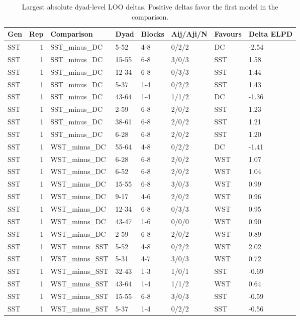 \begin{table}[!h]
\centering
\caption{Largest absolute dyad-level LOO deltas. Positive deltas favor the first model in the comparison.}
\centering
\begin{tabular}[t]{lrllllll}
\toprule
Gen & Rep & Comparison & Dyad & Blocks & Aij/Aji/N & Favours & Delta ELPD\\
\midrule
SST & 1 & SST_minus_DC & 5-52 & 4-8 & 0/2/2 & DC & -2.54\\
SST & 1 & SST_minus_DC & 15-55 & 6-8 & 3/0/3 & SST & 1.58\\
SST & 1 & SST_minus_DC & 12-34 & 6-8 & 0/3/3 & SST & 1.44\\
SST & 1 & SST_minus_DC & 5-37 & 1-4 & 0/2/2 & SST & 1.43\\
SST & 1 & SST_minus_DC & 43-64 & 1-4 & 1/1/2 & DC & -1.36\\
\addlinespace
SST & 1 & SST_minus_DC & 2-59 & 6-8 & 2/0/2 & SST & 1.23\\
SST & 1 & SST_minus_DC & 38-61 & 6-8 & 2/0/2 & SST & 1.21\\
SST & 1 & SST_minus_DC & 6-28 & 6-8 & 2/0/2 & SST & 1.20\\
SST & 1 & WST_minus_DC & 55-64 & 4-8 & 0/2/2 & DC & -1.41\\
SST & 1 & WST_minus_DC & 6-28 & 6-8 & 2/0/2 & WST & 1.07\\
\addlinespace
SST & 1 & WST_minus_DC & 6-52 & 6-8 & 2/0/2 & WST & 1.04\\
SST & 1 & WST_minus_DC & 15-55 & 6-8 & 3/0/3 & WST & 0.99\\
SST & 1 & WST_minus_DC & 9-17 & 4-6 & 2/0/2 & WST & 0.96\\
SST & 1 & WST_minus_DC & 12-34 & 6-8 & 0/3/3 & WST & 0.95\\
SST & 1 & WST_minus_DC & 43-47 & 1-6 & 0/0/0 & WST & 0.90\\
\addlinespace
SST & 1 & WST_minus_DC & 2-59 & 6-8 & 2/0/2 & WST & 0.89\\
SST & 1 & WST_minus_SST & 5-52 & 4-8 & 0/2/2 & WST & 2.02\\
SST & 1 & WST_minus_SST & 5-31 & 4-7 & 3/0/3 & WST & 0.72\\
SST & 1 & WST_minus_SST & 32-43 & 1-3 & 1/0/1 & SST & -0.69\\
SST & 1 & WST_minus_SST & 43-64 & 1-4 & 1/1/2 & WST & 0.64\\
\addlinespace
SST & 1 & WST_minus_SST & 15-55 & 6-8 & 3/0/3 & SST & -0.59\\
SST & 1 & WST_minus_SST & 5-37 & 1-4 & 0/2/2 & SST & -0.56\\

\end{tabular}
\end{table}
